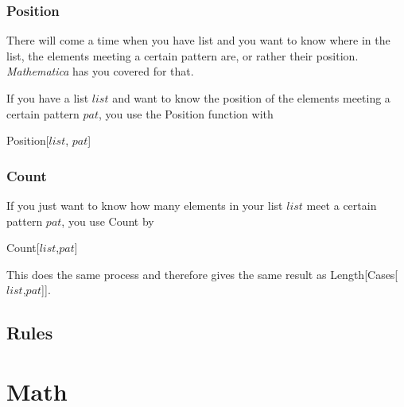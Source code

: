 \documentclass[11pt,letterpaper,twoside,titlepage]{book}
\newcommand{\Mathematica}{\textit{Mathematica} }
\newcommand{\CB}{\emph{Constantly Busy} }
\begin{document}
			\section{Position}
			
				There will come a time when you have list and you want to know where in the list, the elements meeting a certain pattern are, or rather their position.  \Mathematica has you covered for that.
				
				If you have a list $list$ and want to know the position of the elements meeting a certain pattern $pat$, you use the Position function with
				
				\begin{center}
					
					Position[$list$, $pat$]
					
				\end{center}
				
%				
%					
%					

\pagebreak
			
			\section{Count}
			
				If you just want to know how many elements in your list $list$ meet a certain pattern $pat$, you use Count by 
				
				\begin{center}
					
						Count[$list$,$pat$]
					
				\end{center}
				
				This does the same process and therefore gives the same result as Length[Cases[$list$,$pat$]].
		
		\chapter{Rules}
		
	\part{Math}
	
		
\end{document}

